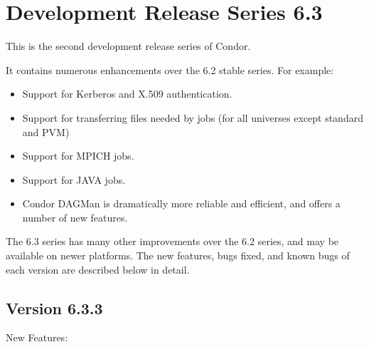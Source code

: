 \section{\label{sec:History-6-3}Development Release Series 6.3}

This is the second development release series of Condor.

It contains numerous enhancements over the 6.2 stable series.
For example:

\begin{itemize}

\item Support for Kerberos and X.509 authentication.

\item Support for transferring files needed by jobs (for all universes
except standard and PVM)

\item Support for MPICH jobs.

\item Support for JAVA jobs.

\item 
Condor DAGMan is dramatically more reliable and efficient, and offers
a number of new features.

\end{itemize}

The 6.3 series has many other improvements over the 6.2 series, and
may be available on newer platforms.  The new features, bugs fixed,
and known bugs of each version are described below in detail.


\subsection*{\label{sec:New-6-3-3}Version 6.3.3}

\noindent New Features:

